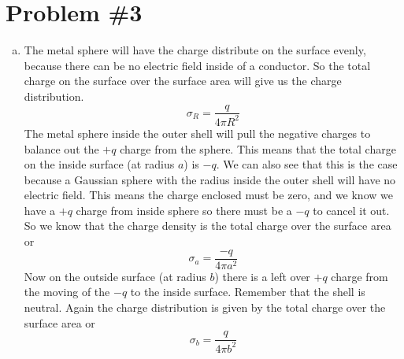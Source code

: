 \documentclass[11pt]{article}
\numberwithin{equation}{section}
\begin{document}
\section{Problem \#3}
\begin{enumerate}[(a)]
\item
The metal sphere will have the charge distribute on the surface evenly, because there can be no electric field inside of a conductor. So the total charge on the surface over the surface area will give us the charge distribution. 
$$\sigma_R = \frac{q}{4\pi R^2}$$
The metal sphere inside the outer shell will pull the negative charges to balance out the $+q$ charge from the sphere. This means that the total charge on the inside surface (at radius $a$) is $-q$. We can also see that this is the case because a Gaussian sphere with the radius inside the outer shell will have no electric field. This means the charge enclosed must be zero, and we know we have a $+q$ charge from inside sphere so there must be a $-q$ to cancel it out. So we know that the charge density is the total charge over the surface area or
$$\sigma_a = \frac{-q}{4\pi a^2}$$
Now on the outside surface (at radius $b$) there is a left over $+q$ charge from the moving of the $-q$ to the inside surface. Remember that the shell is neutral. Again the charge distribution is given by the total charge over the surface area or
$$\sigma_b = \frac{q}{4\pi b^2}$$


\end{enumerate}
\end{document}
